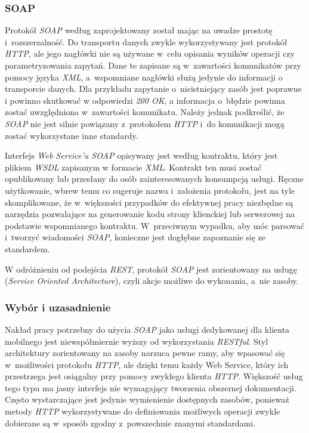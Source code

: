 \documentclass[11pt]{aghdpl}
\begin{document}
\subsubsection{SOAP}

Protokół \emph{SOAP} według \cite{W3Soap} zaprojektowany został mając na uwadze prostotę i~rozszerzalność. Do transportu danych zwykle wykorzystywany jest protokół \emph{HTTP}, ale jego nagłówki nie są używane w~celu opisania wyników operacji czy parametryzowania zapytań. Dane te zapisane są w~zawartości komunikatów przy pomocy języka \emph{XML}, a~wspomniane nagłówki służą jedynie do informacji o transporcie danych. Dla przykładu zapytanie o~nieistniejący zasób jest poprawne i powinno skutkować w odpowiedzi \emph{200 OK}, a informacja o~błędzie powinna zostać uwzględniona w~zawartości komunikatu. Należy jednak podkreślić, że \emph{SOAP} nie jest silnie powiązany z~protokołem \emph{HTTP} i~do komunikacji mogą zostać wykorzystane inne standardy.

Interfejs \emph{Web Service'u SOAP} opisywany jest według kontraktu, który jest plikiem \emph{WSDL} zapisanym w formacie \emph{XML}. Kontrakt ten musi zostać opublikowany lub przesłany do osób zainteresowanych konsumpcją usługi. Ręczne użytkowanie, wbrew temu co sugeruje nazwa i~założenia protokołu, jest na tyle skomplikowane, że w~większości przypadków do efektywnej pracy niezbędne są narzędzia pozwalające na generowanie kodu strony klienckiej lub serwerowej na podstawie wspomnianego kontraktu. W~przeciwnym wypadku, aby móc parsować i~tworzyć wiadomości \emph{SOAP}, konieczne jest dogłębne zapoznanie się ze standardem.

W odróżnieniu od podejścia \emph{REST}, protokół \emph{SOAP} jest zorientowany na usługę (\emph{Service Oriented Architecture}), czyli akcje możliwe do wykonania, a~nie zasoby.

\subsubsection{Wybór i uzasadnienie}

Nakład pracy potrzebny do użycia \emph{SOAP} jako usługi dedykowanej dla klienta mobilnego jest niewspółmiernie wyższy od wykorzystania \emph{RESTful}. Styl architektury zorientowany na zasoby narzuca pewne ramy, aby wpasować się w~możliwości protokołu \emph{HTTP}, ale dzięki temu każdy Web Service, który ich przestrzega jest osiągalny przy pomocy zwykłego klienta \emph{HTTP}. Większość usług tego typu ma jasny interfejs nie wymagający tworzenia obszernej dokumentacji. Często wystarczające jest jedynie wymienienie dostępnych zasobów, ponieważ metody \emph{HTTP} wykorzystywane do definiowania możliwych operacji zwykle dobierane są w~sposób zgodny z~powszechnie znanymi standardami.
\end{document}
